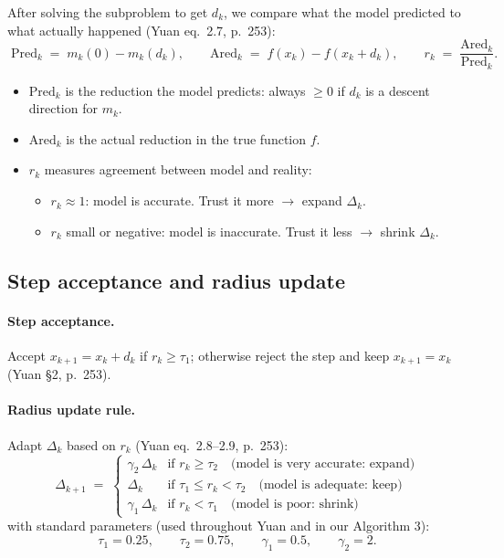 \documentclass[11pt,a4paper]{article}
\begin{document}
After solving the subproblem to get $d_k$, we compare what the model predicted to what actually happened (Yuan eq.\ 2.7, p.\ 253):
\begin{equation}
\boxed{\;
\text{Pred}_k \;=\; m_k(0) - m_k(d_k),\qquad
\text{Ared}_k \;=\; f(x_k) - f(x_k + d_k),\qquad
r_k \;=\; \frac{\text{Ared}_k}{\text{Pred}_k}.
\;}
\tag{Yuan, eq.\ 2.7}
\end{equation}

\begin{itemize}[leftmargin=*,itemsep=2pt]
  \item $\text{Pred}_k$ is the reduction the model predicts: always $\ge 0$ if $d_k$ is a descent direction for $m_k$.
  \item $\text{Ared}_k$ is the actual reduction in the true function $f$.
  \item $r_k$ measures agreement between model and reality:
    \begin{itemize}
      \item $r_k \approx 1$: model is accurate. Trust it more $\to$ expand $\Delta_k$.
      \item $r_k$ small or negative: model is inaccurate. Trust it less $\to$ shrink $\Delta_k$.
    \end{itemize}
\end{itemize}

\subsection{Step acceptance and radius update}

\paragraph{Step acceptance.} Accept $x_{k+1} = x_k + d_k$ if $r_k \ge \tau_1$; otherwise reject the step and keep $x_{k+1} = x_k$ (Yuan \S 2, p.\ 253).

\paragraph{Radius update rule.} Adapt $\Delta_k$ based on $r_k$ (Yuan eq.\ 2.8--2.9, p.\ 253):
\begin{equation}
\boxed{\;
\Delta_{k+1} \;=\;
\begin{cases}
\gamma_2\,\Delta_k & \text{if } r_k \ge \tau_2 \quad\text{(model is very accurate: expand)}\\[3pt]
\Delta_k & \text{if } \tau_1 \le r_k < \tau_2 \quad\text{(model is adequate: keep)}\\[3pt]
\gamma_1\,\Delta_k & \text{if } r_k < \tau_1 \quad\text{(model is poor: shrink)}
\end{cases}
\;}
\tag{Yuan, eq.\ 2.8--2.9}
\end{equation}
with standard parameters (used throughout Yuan and in our Algorithm 3):
\[
\tau_1 = 0.25,\qquad \tau_2 = 0.75,\qquad \gamma_1 = 0.5,\qquad \gamma_2 = 2.
\]
\end{document}
